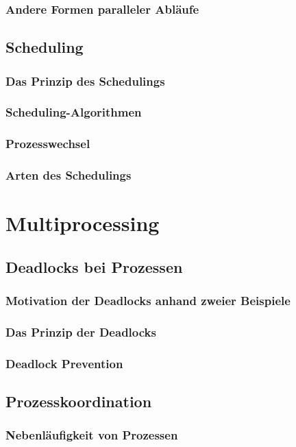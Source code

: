 \documentclass{article}
\begin{document}
\subsubsection{Andere Formen paralleler Abläufe}
\subsection{Scheduling}
\subsubsection{Das Prinzip des Schedulings}
\subsubsection{Scheduling-Algorithmen}
\subsubsection{Prozesswechsel}
\subsubsection{Arten des Schedulings}

\newpage
\section{Multiprocessing}
\subsection{Deadlocks bei Prozessen}
\subsubsection{Motivation der Deadlocks anhand zweier Beispiele}
\subsubsection{Das Prinzip der Deadlocks}
\subsubsection{Deadlock Prevention}
\subsection{Prozesskoordination}
\subsubsection{Nebenläufigkeit von Prozessen}
\end{document}
